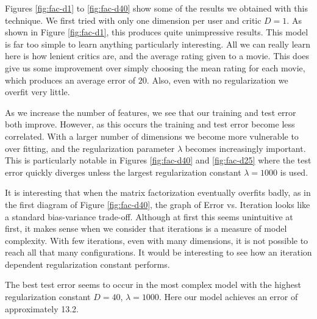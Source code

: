 \documentclass[10.5pt]{article}
\newcommand{\matrixtesterror}{13.2}
\begin{document}
Figures \ref{fig:fac-d1} to \ref{fig:fac-d40} show some of the results we 
obtained with this technique. We first tried with only one dimension 
per user and critic $D=1$. As shown in Figure  \ref{fig:fac-d1}, this 
produces quite unimpressive results. This model is far too 
simple to learn anything particularly interesting. All we can really learn here 
is how lenient critics are, and the average rating given to a movie. This does 
give us some improvement over simply choosing the mean rating for each movie, 
which produces an average error of $20$. Also, even with no regularization we 
overfit very little.

As we increase the number of features, we see that our training and test error 
both improve. However, as this occurs the training and test error become less 
correlated. With a larger number of dimensions we become more vulnerable to 
over fitting, and the regularization parameter $\lambda$ becomes 
increasingly important. This is particularly notable in Figures 
\ref{fig:fac-d40} and \ref{fig:fac-d25} where the test error quickly diverges
unless the largest regularization constant $\lambda = 1000$ is used.

It is interesting that when the matrix factorization eventually overfits 
badly, as in the first diagram of Figure \ref{fig:fac-d40}, the graph of 
Error vs. Iteration looks like a standard bias-variance trade-off. Although 
at first this seems unintuitive at first, it makes sense when we consider that 
iterations is a measure of model complexity. With few iterations, even with 
many dimensions, it is not possible to reach all that many configurations. 
It would be interesting to see how an iteration dependent regularization 
constant performs. 

The best test error seems to occur in the most complex model with the highest 
regularization constant $D=40$, $\lambda = 1000$. Here our model achieves an 
error of approximately \matrixtesterror.
\end{document}
